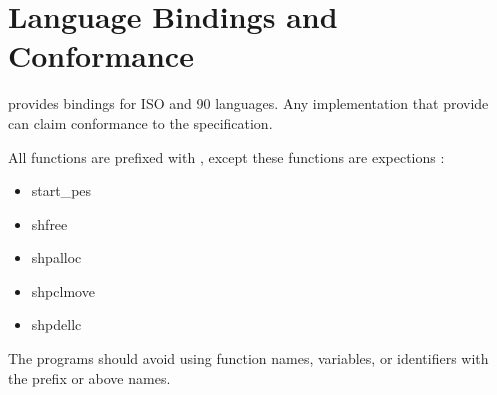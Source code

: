 \section{Language Bindings and Conformance}



\openshmem provides bindings for ISO \Clang{} and \Fortran{} 90 languages. Any
implementation that provide \Clang{} can claim conformance to the specification.

All \openshmem{} functions are prefixed with \shmemprefix{}, except these
functions are expections :
\begin{itemize}
\item start\_pes{}
\item shfree{}
\item shpalloc{}
\item shpclmove{}
\item shpdellc{}
\end{itemize}

The \openshmem{} programs should avoid using function names, variables, or
identifiers with the prefix \shmemprefix{} or above names. 
